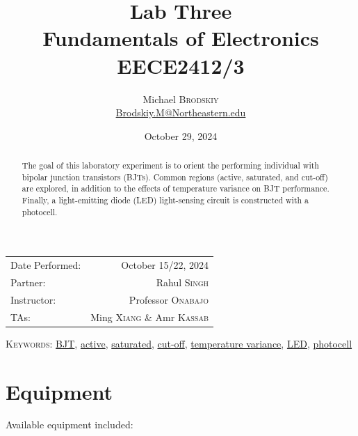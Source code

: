 \documentclass[
	letterpaper, %
	10pt, %
]{CSUniSchoolLabReport}
\title{Lab Three\\ Fundamentals of Electronics \\ EECE2412/3} %
\author{Michael \textsc{Brodskiy}\\ \small \href{mailto:Brodskiy.M@Northeastern.edu}{Brodskiy.M@Northeastern.edu}}
\date{October 29, 2024} %
\begin{document}
\maketitle %

\begin{center}
	\begin{tabular}{l r}
		Date Performed: & October 15/22, 2024 \\ %
        Partner: & Rahul \textsc{Singh} \\ %
		Instructor: & Professor \textsc{Onabajo} \\ %
        TAs: & Ming \textsc{Xiang} \& Amr \textsc{Kassab} \\ %
	\end{tabular}
\end{center}

\newpage

\begin{abstract}

  The goal of this laboratory experiment is to orient the performing individual with bipolar junction transistors (BJTs). Common regions (active, saturated, and cut-off) are explored, in addition to the effects of temperature variance on BJT performance. Finally, a light-emitting diode (LED) light-sensing circuit is constructed with a photocell. 

\end{abstract}

\begin{flushleft}

  \textsc{Keywords:} \underline{BJT}, \underline{active}, \underline{saturated}, \underline{cut-off}, \underline{temperature variance}, \underline{LED}, \underline{photocell}

\end{flushleft}

\newpage

\tableofcontents
\listoffigures

\newpage

\section{Equipment}

Available equipment included:\\
\end{document}
